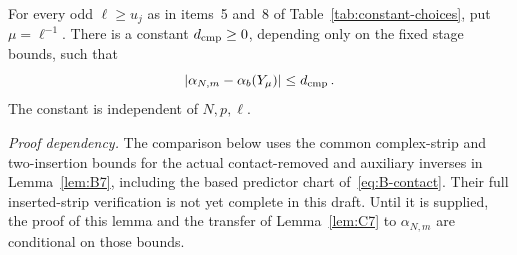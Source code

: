 \begin{lemma}\label{lem:C6}
For every odd $\ell\ge u_j$ as in items~5 and~8 of Table~\ref{tab:constant-choices}, put $\mu=\ell^{-1}$. There is a constant $d_{\rm cmp}\ge0$, depending only on the fixed stage bounds, such that
\begin{equation*}
|\alpha_{N,m}-\alpha_b(Y_\mu)|\le d_{\rm cmp}\,.
\end{equation*}
The constant is independent of $N,p,\ell$.
\end{lemma}

\noindent\emph{Proof dependency.} The comparison below uses the common complex-strip and two-insertion bounds for the actual contact-removed and auxiliary inverses in Lemma~\ref{lem:B7}, including the based predictor chart of~\eqref{eq:B-contact}. Their full inserted-strip verification is not yet complete in this draft. Until it is supplied, the proof of this lemma and the transfer of Lemma~\ref{lem:C7} to $\alpha_{N,m}$ are conditional on those bounds.

